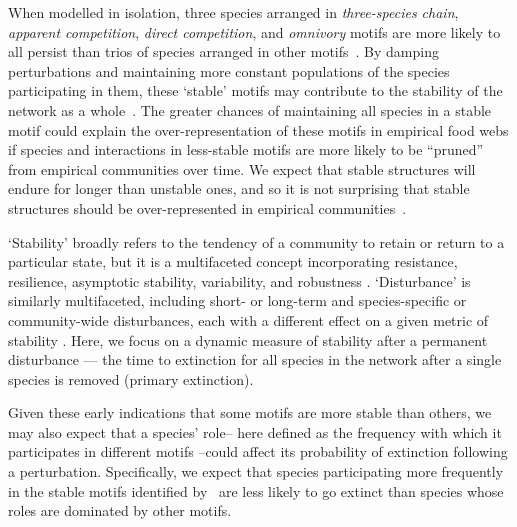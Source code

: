 \documentclass[12pt]{article}
\begin{document}
\begin{spacing}{2.0}
	When modelled in isolation, three species arranged in \emph{three-species chain}, \emph{apparent competition}, \emph{direct competition}, and \emph{omnivory} motifs are more likely to all persist than trios of species arranged in other motifs~\citep{Borrelli2015a}.
	By damping perturbations and maintaining more constant populations of the species participating in them, these `stable' motifs may contribute to the stability of the network as a whole~\citep{Borrelli2015a}. 
    The greater chances of maintaining all species in a stable motif could explain the over-representation of these motifs in empirical food webs if species and interactions in less-stable motifs are more likely to be ``pruned'' from empirical communities over time. We expect that stable structures will endure for longer than unstable ones, and so it is not surprising that stable structures should be over-represented in empirical communities~\citep{Borrelli2015}.


    `Stability' broadly refers to the tendency of a community to retain or return to a particular state, but it is a multifaceted concept incorporating resistance, resilience, asymptotic stability, variability, and robustness \citep{Donohue2013}. `Disturbance' is similarly multifaceted, including short- or long-term and species-specific or community-wide disturbances, each with a different effect on a given metric of stability \citep{Donohue2013,Radchuck2019}.
    Here, we focus on a dynamic measure of stability after a permanent disturbance --- the time to extinction for all species in the network after a single species is removed (primary extinction).
    
    
	Given these early indications that some motifs are more stable than others, we may also expect that a species' role-- here defined as the frequency with which it participates in different motifs --could affect its probability of extinction following a perturbation.
	Specifically, we expect that species participating more frequently in the stable motifs identified by~\citet{Borrelli2015a} are less likely to go extinct than species whose roles are dominated by other motifs.
	 
	
	

\end{spacing}
\end{document}
